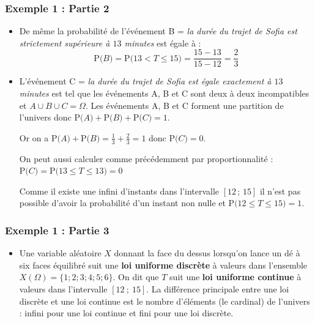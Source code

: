 \documentclass[xcolor=svgnames,t,final]{beamer}
\newcommand{\Interff}[2]{\left[#1\, ;\, #2\right]}
\newcommand{\proba}[1]{\text{P}\big(#1\big)}
\begin{document}
\begin{frame}

\frametitle{Exemple 1 : Partie 2}




\begin{itemize}


	\pause \item De même la probabilité de l'événement B = \og{} \textit{la durée du trajet de Sofia est strictement supérieure à $13$ minutes} \fg{} est égale à :
\begin{equation*}
\proba{B}=\proba{13 <T \leqslant 15}=\frac{15 - 13}{15-12}=\frac{2}{3}
\end{equation*}
	
	\pause	\item L'événement C = \og{} \textit{la durée du trajet de Sofia est égale exactement à $13$ minutes} \fg{} est tel que  les événements A, B et C sont deux à deux incompatibles et $A \cup B \cup C= \Omega$. Les événements A, B et C forment une partition de l'univers donc $\proba{A}+\proba{B}+\proba{C}=1$.
		
Or on a $\proba{A}+\proba{B}=\frac{1}{3}+\frac{2}{3}=1$ donc $\proba{C}=0$.

On peut aussi calculer comme précédemment par proportionnalité : $\proba{C}=\proba{13 \leqslant T \leqslant 13}=0$

Comme il existe une infini d'instants dans l'intervalle $\Interff{12}{15}$ il n'est pas possible d'avoir la probabilité d'un instant non nulle et $\proba{12\leqslant T \leqslant 15}=1$.

		


\end{itemize}



\end{frame}


\begin{frame}

\frametitle{Exemple 1 : Partie 3}



\begin{itemize}

\item Une variable aléatoire $X$ donnant la face du dessus lorsqu'on lance un dé à six faces équilibré suit une \textbf{loi uniforme discrète} à valeurs dans l'ensemble $X(\Omega)=\{1;2;3;4;5;6\}$. On dit que $T$ suit une \textbf{loi uniforme continue} à valeurs dans l'intervalle $[12~;~15]$. 
La différence principale entre une loi discrète et une loi continue est le nombre d'éléments (le cardinal) de l'univers : infini pour une loi continue et fini  pour une loi discrète.

		
\end{itemize}



\end{frame}
\end{document}
